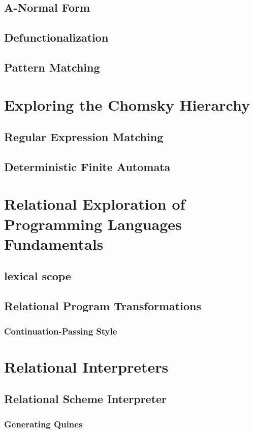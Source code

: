 \documentclass[onecolumn, 11pt, oneside, openright]{book}
\begin{document}
\begin{schemeregion}
\section{A-Normal Form}
\section{Defunctionalization}
\section{Pattern Matching}

\chapter{Exploring the Chomsky Hierarchy}
\section{Regular Expression Matching}
\section{Deterministic Finite Automata}

\chapter{Relational Exploration of Programming Languages Fundamentals}
\section{lexical scope}
\section{Relational Program Transformations}
\subsection{Continuation-Passing Style}

\chapter{Relational Interpreters}
\section{Relational Scheme Interpreter}
\subsection{Generating Quines}

\end{schemeregion}
\end{document}
